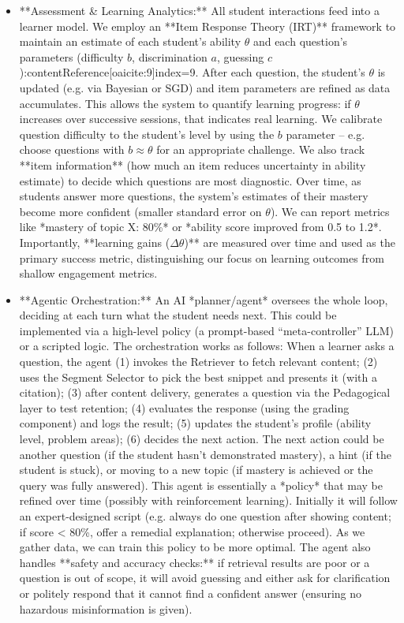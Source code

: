 \documentclass[11pt]{article}
\begin{document}
\begin{itemize}
  \item **Assessment \& Learning Analytics:** All student interactions feed into a learner model. We employ an **Item Response Theory (IRT)** framework to maintain an estimate of each student’s ability $\theta$ and each question’s parameters (difficulty $b$, discrimination $a$, guessing $c$):contentReference[oaicite:9]{index=9}. After each question, the student’s $\theta$ is updated (e.g. via Bayesian or SGD) and item parameters are refined as data accumulates. This allows the system to quantify learning progress: if $\theta$ increases over successive sessions, that indicates real learning. We calibrate question difficulty to the student’s level by using the $b$ parameter – e.g. choose questions with $b \approx \theta$ for an appropriate challenge. We also track **item information** (how much an item reduces uncertainty in ability estimate) to decide which questions are most diagnostic. Over time, as students answer more questions, the system’s estimates of their mastery become more confident (smaller standard error on $\theta$). We can report metrics like *mastery of topic X: 80\%* or *ability score improved from 0.5 to 1.2*. Importantly, **learning gains ($\Delta \theta$)** are measured over time and used as the primary success metric, distinguishing our focus on learning outcomes from shallow engagement metrics.
  \item **Agentic Orchestration:** An AI *planner/agent* oversees the whole loop, deciding at each turn what the student needs next. This could be implemented via a high-level policy (a prompt-based “meta-controller” LLM) or a scripted logic. The orchestration works as follows: When a learner asks a question, the agent (1) invokes the Retriever to fetch relevant content; (2) uses the Segment Selector to pick the best snippet and presents it (with a citation); (3) after content delivery, generates a question via the Pedagogical layer to test retention; (4) evaluates the response (using the grading component) and logs the result; (5) updates the student’s profile (ability level, problem areas); (6) decides the next action. The next action could be another question (if the student hasn’t demonstrated mastery), a hint (if the student is stuck), or moving to a new topic (if mastery is achieved or the query was fully answered). This agent is essentially a *policy* that may be refined over time (possibly with reinforcement learning). Initially it will follow an expert-designed script (e.g. always do one question after showing content; if score < 80\%, offer a remedial explanation; otherwise proceed). As we gather data, we can train this policy to be more optimal. The agent also handles **safety and accuracy checks:** if retrieval results are poor or a question is out of scope, it will avoid guessing and either ask for clarification or politely respond that it cannot find a confident answer (ensuring no hazardous misinformation is given).
\end{itemize}
\end{document}
